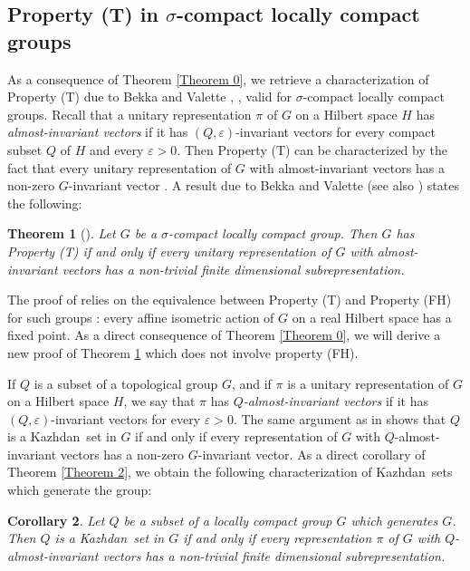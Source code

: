 \documentclass[11pt,english,a4paper]{smfart}
\numberwithin{equation}{section}
\newtheorem{theorem}{Theorem}[section]
\newtheorem{corollary}[theorem]{Corollary}
\theoremstyle{definition}
\begin{document}
\subsection{Property (T) in $\sigma $-compact 
locally compact groups}\label{Section7.1}
As a  consequence of Theorem \ref{Theorem 0}, we retrieve a 
characterization of Property (T) due to Bekka and Valette \cite{BV}, 
\cite[Th.~2.12.9]{BdHV}, valid for $\sigma $-compact locally compact  
groups. Recall that a unitary representation $\pi $ of $G$ on a Hilbert 
space $H$ has \emph{almost-invariant vectors} if it has $({Q},\varepsilon 
)$-invariant vectors for every compact subset ${Q}$ of $H$ and every 
$\varepsilon >0$. Then Property (T) can be characterized by the fact that 
every unitary representation of $G$ with almost-invariant vectors has a 
non-zero $G$-invariant vector \cite[Prop.~1.2.1]{BdHV}. A result due to Bekka and Valette \cite{BV} (see also 
\cite[Th. 2.12.9]{BdHV}) states the following:
\begin{theorem}[\!\!\cite{BV}]\label{Theorem 7.1}
Let $G$ be a $\sigma $-compact locally compact group. 
Then $G$ has 
Property (T) if and only if every unitary representation of $G$ with 
almost-invariant vectors has a non-trivial finite dimensional 
subrepresentation.
\end{theorem}
The proof of \cite{BV} relies on the equivalence between Property (T) and 
Property (FH) for such groups \cite[Th.~2.12.4]{BdHV}: every affine 
isometric action of $G$ on a real Hilbert space has a fixed point. As a 
direct consequence of Theorem \ref{Theorem 0}, we will derive a new proof of 
Theorem \ref{Theorem 7.1} which does not involve property (FH).
\par\smallskip
If ${Q}$ is a subset of a topological group $G$, and if $\pi $ is a unitary representation of $G$ on a Hilbert space $H$, we say that $\pi $ has \emph{${Q}$-almost-invariant vectors} if it has $({Q},\varepsilon )$-invariant vectors for every $\varepsilon >0$. The same argument as in  \cite[Prop.~1.2.1]{BdHV} shows that ${Q}$ is a {Kazhdan}\ set in $G$ if and only if every representation of $G$ with ${Q}$-almost-invariant vectors has a non-zero $G$-invariant vector. As a direct corollary of Theorem \ref{Theorem 2}, we obtain the following characterization of {Kazhdan}\ sets which generate the group:
\begin{corollary}\label{CorollaryA}
Let ${Q}$ be a subset of a locally compact group $G$ which generates $G$. Then ${Q}$ is a {Kazhdan}\ set in $G$ if and only if every representation $\pi $ of $G$ with ${Q}$-almost-invariant vectors has a non-trivial finite dimensional subrepresentation.
\end{corollary}
\end{document}
